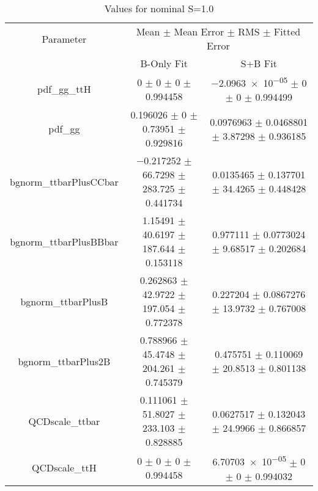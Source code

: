 \begin{table}
\centering
\caption{Values for nominal S=1.0}
\begin{tabular}{ccc}
\toprule
Parameter & \multicolumn{2}{c}{Mean $\pm$ Mean Error $\pm$ RMS $\pm$ Fitted Error}\\
 & B-Only Fit & S+B Fit\\
\midrule
pdf\_gg\_ttH & \num{0} $\pm$ \num{0} $\pm$ \num{0} $\pm$ \num{0.994458} & \num{-2.0963e-05} $\pm$ \num{0} $\pm$ \num{0} $\pm$ \num{0.994499}\\
pdf\_gg & \num{0.196026} $\pm$ \num{0} $\pm$ \num{0.73951} $\pm$ \num{0.929816} & \num{0.0976963} $\pm$ \num{0.0468801} $\pm$ \num{3.87298} $\pm$ \num{0.936185}\\
bgnorm\_ttbarPlusCCbar & \num{-0.217252} $\pm$ \num{66.7298} $\pm$ \num{283.725} $\pm$ \num{0.441734} & \num{0.0135465} $\pm$ \num{0.137701} $\pm$ \num{34.4265} $\pm$ \num{0.448428}\\
bgnorm\_ttbarPlusBBbar & \num{1.15491} $\pm$ \num{40.6197} $\pm$ \num{187.644} $\pm$ \num{0.153118} & \num{0.977111} $\pm$ \num{0.0773024} $\pm$ \num{9.68517} $\pm$ \num{0.202684}\\
bgnorm\_ttbarPlusB & \num{0.262863} $\pm$ \num{42.9722} $\pm$ \num{197.054} $\pm$ \num{0.772378} & \num{0.227204} $\pm$ \num{0.0867276} $\pm$ \num{13.9732} $\pm$ \num{0.767008}\\
bgnorm\_ttbarPlus2B & \num{0.788966} $\pm$ \num{45.4748} $\pm$ \num{204.261} $\pm$ \num{0.745379} & \num{0.475751} $\pm$ \num{0.110069} $\pm$ \num{20.8513} $\pm$ \num{0.801138}\\
QCDscale\_ttbar & \num{0.111061} $\pm$ \num{51.8027} $\pm$ \num{233.103} $\pm$ \num{0.828885} & \num{0.0627517} $\pm$ \num{0.132043} $\pm$ \num{24.9966} $\pm$ \num{0.866857}\\
QCDscale\_ttH & \num{0} $\pm$ \num{0} $\pm$ \num{0} $\pm$ \num{0.994458} & \num{6.70703e-05} $\pm$ \num{0} $\pm$ \num{0} $\pm$ \num{0.994032}\\
\bottomrule
\end{tabular}
\end{table}